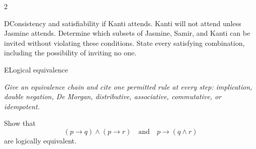 \documentclass[9pt]{extarticle}
\begin{document}
\begin{multicols}{2}
\begin{CoreProblem}{D}{Consistency and satisfiability}
if Kanti attends. Kanti will not attend unless Jasmine attends. Determine which
subsets of Jasmine, Samir, and Kanti can be invited without violating these
conditions. State every satisfying combination, including the possibility of
inviting no one.
\end{CoreProblem}
\begin{CoreProblem}{E}{Logical equivalence}
{\scriptsize\textit{Give an equivalence chain and cite one permitted rule at every step: implication, double negation, De Morgan, distributive, associative, commutative, or idempotent.}\par}
Show that
\[
  (p\to q)\land(p\to r)
  \quad\text{and}\quad
  p\to(q\land r)
\]
are logically equivalent.
\end{CoreProblem}
\end{multicols}
\CoreWorkArea
\FormBreak
{}
\end{document}
